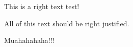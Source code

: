 \documentclass[letterpaper,portrait,12pt]{article}
\begin{document}
\setlength{\oddsidemargin}{0.7874in-1in}
\setlength{\textwidth}{\paperwidth - 0.7874in-0.7874in}

\begin{flushright}
This is a right text test!
\end{flushright}


\begin{flushright}

\end{flushright}


\begin{flushright}

\end{flushright}


\begin{flushright}
All of this text should be right justified.
\end{flushright}


\begin{flushright}

\end{flushright}


\begin{flushright}

\end{flushright}


\begin{flushright}
Muahahahaha!!!
\end{flushright}
\end{document}

